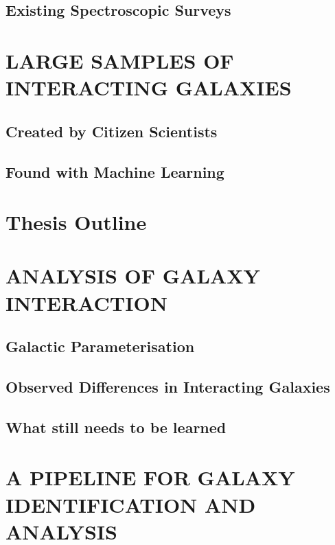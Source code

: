 \subsection{Existing Spectroscopic Surveys}


\section{LARGE SAMPLES OF INTERACTING GALAXIES}
\subsection{Created by Citizen Scientists}
\subsection{Found with Machine Learning}
\section{Thesis Outline}

\section{ANALYSIS OF GALAXY INTERACTION}
\subsection{Galactic Parameterisation}
\subsection{Observed Differences in Interacting Galaxies}
\subsection{What still needs to be learned}

\section{A PIPELINE FOR GALAXY IDENTIFICATION AND ANALYSIS}